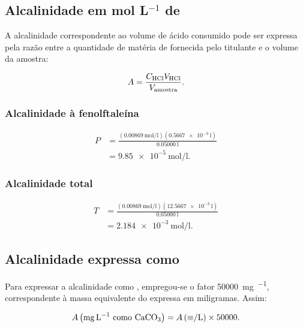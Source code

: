 \documentclass[a4paper,12pt]{article}
\begin{document}
\subsection{Alcalinidade em mol L\texorpdfstring{$^{-1}$}{-1} de }

A alcalinidade correspondente ao volume de ácido consumido pode ser
expressa pela razão entre a quantidade de matéria de  fornecida
pelo titulante e o volume da amostra:

\begin{equation}
A=
\frac{C_{\ce{HCl}}V_{\ce{HCl}}}{V_{\text{amostra}}}.
\label{eq:alcalinidade_molar}
\end{equation}

\subsubsection*{Alcalinidade à fenolftaleína}

\begin{align}
P
&=
\frac{
\left(\qty{0.00869}{\mole\per\litre}\right)
\left(\qty{0.5667e-3}{\litre}\right)}
{\qty{0.05000}{\litre}}\\
&=
\boxed{\qty{9.85e-5}{\mole\per\litre}}.
\end{align}

\subsubsection*{Alcalinidade total}

\begin{align}
T
&=
\frac{
\left(\qty{0.00869}{\mole\per\litre}\right)
\left(\qty{12.5667e-3}{\litre}\right)}
{\qty{0.05000}{\litre}}\\
&=
\boxed{\qty{2.184e-3}{\mole\per\litre}}.
\end{align}

\subsection{Alcalinidade expressa como }

Para expressar a alcalinidade como , empregou-se o fator
\qty{50000}{\milli\gram\per\equiv}, correspondente à massa equivalente do
 expressa em miligramas. Assim:

\begin{equation}
A\left(\si{\milli\gram\per\litre}\ \text{como \ce{CaCO3}}\right)
=
A\left(\si{\equiv\per\litre}\right)
\times
50000.
\end{equation}
\end{document}
